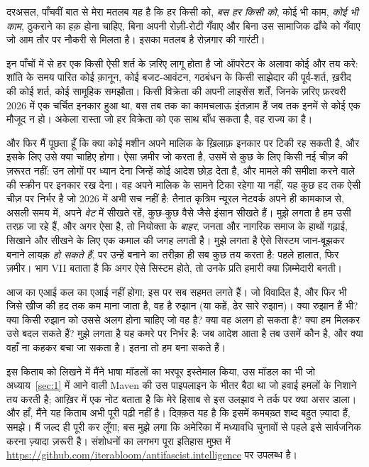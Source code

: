 दरअसल, पाँचवीं बात से मेरा मतलब यह है कि हर किसी को, \emph{बस हर किसी को}, कोई भी काम, \emph{कोई भी काम}, ठुकराने का हक़ होना चाहिए, बिना अपनी रोज़ी-रोटी गँवाए और बिना उस सामाजिक ढाँचे को गँवाए जो आम तौर पर नौकरी से मिलता है। इसका मतलब है रोज़गार की गारंटी।

इन पाँचों में से हर एक किसी ऐसी शर्त के ज़रिए लागू होता है जो ऑपरेटर के अलावा कोई और तय करे: शांति के समय पारित कोई क़ानून, कोई बजट-आवंटन, गठबंधन के किसी साझेदार की पूर्व-शर्त, ख़रीद की कोई शर्त, कोई सामूहिक समझौता। किसी विक्रेता की अपनी लाइसेंस शर्तें, जिनके ज़रिए फ़रवरी 2026 में एक चर्चित इनकार हुआ था, बस तब तक का कामचलाऊ इंतज़ाम हैं जब तक इनमें से कोई एक मौजूद न हो। अकेला रास्ता जो हर विक्रेता को एक साथ बाँध सकता है, वह राज्य का है।

और फिर मैं पूछता हूँ कि क्या कोई मशीन अपने मालिक के ख़िलाफ़ इनकार पर टिकी रह सकती है, और इसके लिए उसे क्या चाहिए होगा। ऐसा ज़मीर जो करता है, उसमें से कुछ के लिए किसी नई चीज़ की ज़रूरत नहीं: उन लोगों पर ध्यान देना जिन्हें कोई आदेश छोड़ देता है, और मामले की समीक्षा करने वाले की स्क्रीन पर इनकार रख देना। वह अपने मालिक के सामने टिका रहेगा या नहीं, यह कुछ हद तक ऐसी चीज़ पर निर्भर है जो 2026 में अभी सच नहीं है: तैनात कृत्रिम न्यूरल नेटवर्क अपने ही कामकाज से, असली समय में, अपने \emph{वेट} में सीखते रहें, कुछ-कुछ वैसे जैसे इंसान सीखते हैं। मुझे लगता है हम उसी तरफ़ जा रहे हैं, और अगर ऐसा है, तो नियोक्ता के \emph{बाहर}, जनता और नागरिक समाज के हाथों गढ़ाई, सिखाने और सीखने के लिए एक कमाल की जगह लगती है। मुझे लगता है ऐसे सिस्टम जान-बूझकर बनाने लायक़ \emph{हो सकते हैं}, पर उन्हें बनाने का तरीक़ा ही सब कुछ तय करता है: पहले हालात, फिर ज़मीर। भाग VII बताता है कि अगर ऐसे सिस्टम होते, तो उनके प्रति हमारी क्या ज़िम्मेदारी बनती।

आज का एआई कल का एआई नहीं होगा; इस पर सब सहमत लगते हैं। जो विवादित है, और फिर भी जिसे खीज की हद तक कम माना जाता है, वह है रुझान (या कहें, ढेर सारे रुझान)। क्या रुझान हैं भी? क्या किसी रुझान को उससे अलग होना चाहिए जो वह है? क्या वह अलग हो सकता है? क्या हम मिलकर उसे बदल सकते हैं? मुझे लगता है यह कमरे पर निर्भर है: जब आदेश आता है तब उसमें कौन है, और क्या वहाँ ना कहकर बचा जा सकता है। इतना तो हम बना सकते हैं।

इस किताब को लिखने में मैंने भाषा मॉडलों का भरपूर इस्तेमाल किया, उस मॉडल का भी जो अध्याय~\ref{sec:1} में आने वाली Maven की उस पाइपलाइन के भीतर बैठा था जो हवाई हमलों के निशाने तय करती है; आख़िर में एक नोट बताता है कि मेरे हिसाब से इस उलझाव ने तर्क पर क्या असर डाला। और हाँ, मैंने यह किताब अभी पूरी पढ़ी नहीं है। दिक़्क़त यह है कि इसमें कमबख़्त शब्द बहुत ज़्यादा हैं, समझे। मैं जल्द ही पूरी कर लूँगा; बस मुझे लगा कि अमेरिका में मध्यावधि चुनावों से पहले इसे सार्वजनिक करना ज़्यादा ज़रूरी है। संशोधनों का लगभग पूरा इतिहास मुफ़्त में \url{https://github.com/iterabloom/antifascist.intelligence} पर उपलब्ध है।
